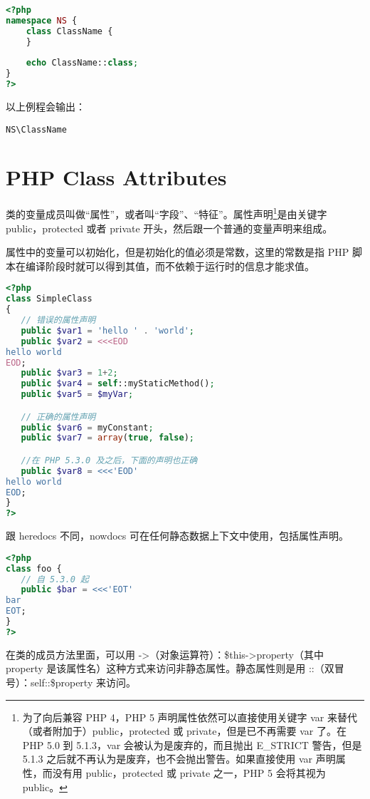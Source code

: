 \begin{lstlisting}[language=PHP]
<?php
namespace NS {
    class ClassName {
    }
    
    echo ClassName::class;
}
?>
\end{lstlisting}

以上例程会输出：

\begin{verbatim}
NS\ClassName
\end{verbatim}

\chapter{PHP Class Attributes}

类的变量成员叫做“属性”，或者叫“字段”、“特征”。属性声明\footnote{为了向后兼容 PHP 4，PHP 5 声明属性依然可以直接使用关键字 var 来替代（或者附加于）public，protected 或 private，但是已不再需要 var 了。在 PHP 5.0 到 5.1.3，var 会被认为是废弃的，而且抛出 E\_STRICT 警告，但是 5.1.3 之后就不再认为是废弃，也不会抛出警告。如果直接使用 var 声明属性，而没有用 public，protected 或 private 之一，PHP 5 会将其视为 public。}是由关键字 public，protected 或者 private 开头，然后跟一个普通的变量声明来组成。

属性中的变量可以初始化，但是初始化的值必须是常数，这里的常数是指 PHP 脚本在编译阶段时就可以得到其值，而不依赖于运行时的信息才能求值。

\begin{lstlisting}[language=PHP]
<?php
class SimpleClass
{
   // 错误的属性声明
   public $var1 = 'hello ' . 'world';
   public $var2 = <<<EOD
hello world
EOD;
   public $var3 = 1+2;
   public $var4 = self::myStaticMethod();
   public $var5 = $myVar;

   // 正确的属性声明
   public $var6 = myConstant;
   public $var7 = array(true, false);

   //在 PHP 5.3.0 及之后，下面的声明也正确
   public $var8 = <<<'EOD'
hello world
EOD;
}
?>
\end{lstlisting}

跟 heredocs 不同，nowdocs 可在任何静态数据上下文中使用，包括属性声明。

\begin{lstlisting}[language=PHP]
<?php
class foo {
   // 自 5.3.0 起
   public $bar = <<<'EOT'
bar
EOT;
}
?>
\end{lstlisting}


在类的成员方法里面，可以用 ->（对象运算符）：\$this->property（其中 property 是该属性名）这种方式来访问非静态属性。静态属性则是用 ::（双冒号）：self::\$property 来访问。

